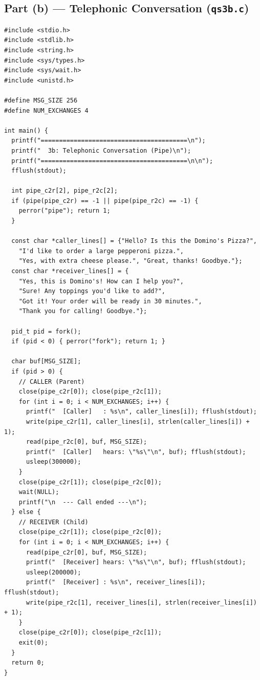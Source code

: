 \documentclass[11pt,a4paper]{article}
\begin{document}
\newpage

\subsection*{Part (b) --- Telephonic Conversation (\texttt{qs3b.c})}
\begin{codebox}
\begin{lstlisting}[style=cstyle]
#include <stdio.h>
#include <stdlib.h>
#include <string.h>
#include <sys/types.h>
#include <sys/wait.h>
#include <unistd.h>

#define MSG_SIZE 256
#define NUM_EXCHANGES 4

int main() {
  printf("========================================\n");
  printf("  3b: Telephonic Conversation (Pipe)\n");
  printf("========================================\n\n");
  fflush(stdout);

  int pipe_c2r[2], pipe_r2c[2];
  if (pipe(pipe_c2r) == -1 || pipe(pipe_r2c) == -1) {
    perror("pipe"); return 1;
  }

  const char *caller_lines[] = {"Hello? Is this the Domino's Pizza?",
    "I'd like to order a large pepperoni pizza.",
    "Yes, with extra cheese please.", "Great, thanks! Goodbye."};
  const char *receiver_lines[] = {
    "Yes, this is Domino's! How can I help you?",
    "Sure! Any toppings you'd like to add?",
    "Got it! Your order will be ready in 30 minutes.",
    "Thank you for calling! Goodbye."};

  pid_t pid = fork();
  if (pid < 0) { perror("fork"); return 1; }

  char buf[MSG_SIZE];
  if (pid > 0) {
    // CALLER (Parent)
    close(pipe_c2r[0]); close(pipe_r2c[1]);
    for (int i = 0; i < NUM_EXCHANGES; i++) {
      printf("  [Caller]   : %s\n", caller_lines[i]); fflush(stdout);
      write(pipe_c2r[1], caller_lines[i], strlen(caller_lines[i]) + 1);
      read(pipe_r2c[0], buf, MSG_SIZE);
      printf("  [Caller]   hears: \"%s\"\n", buf); fflush(stdout);
      usleep(300000);
    }
    close(pipe_c2r[1]); close(pipe_r2c[0]);
    wait(NULL);
    printf("\n  --- Call ended ---\n");
  } else {
    // RECEIVER (Child)
    close(pipe_c2r[1]); close(pipe_r2c[0]);
    for (int i = 0; i < NUM_EXCHANGES; i++) {
      read(pipe_c2r[0], buf, MSG_SIZE);
      printf("  [Receiver] hears: \"%s\"\n", buf); fflush(stdout);
      usleep(200000);
      printf("  [Receiver] : %s\n", receiver_lines[i]); fflush(stdout);
      write(pipe_r2c[1], receiver_lines[i], strlen(receiver_lines[i]) + 1);
    }
    close(pipe_c2r[0]); close(pipe_r2c[1]);
    exit(0);
  }
  return 0;
}
\end{lstlisting}
\end{codebox}
\end{document}
